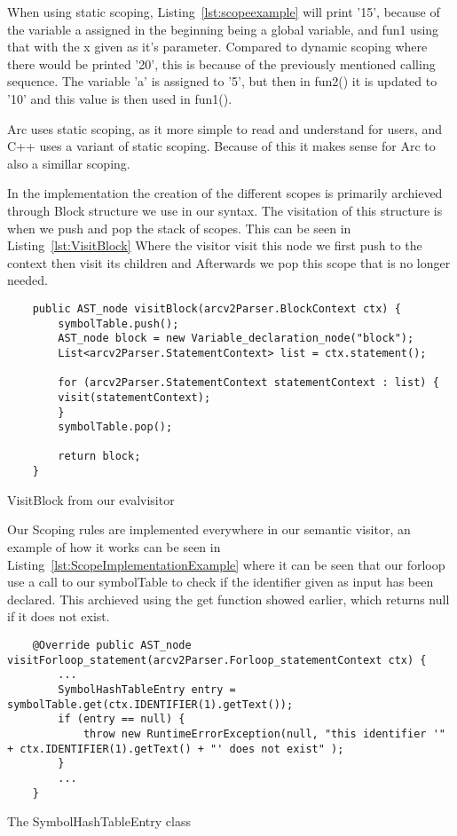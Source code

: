 When using static scoping, Listing~\ref{lst:scopeexample} will print '15', because of the variable a assigned in the beginning being a global variable, and fun1 using that with the x given as it's parameter. Compared to dynamic scoping where there would be printed '20', this is because of the previously mentioned calling sequence. The variable 'a' is assigned to '5', but then in fun2() it is updated to '10' and this value is then used in fun1().

Arc uses static scoping, as it more simple to read and understand for users, and C++ uses a variant of static scoping. Because of this it makes sense for Arc to also a simillar scoping.

In the implementation the creation of the different scopes is primarily archieved through Block structure we use in our syntax. The visitation of this structure is when we push and pop the stack of scopes. This can be seen in Listing~\ref{lst:VisitBlock} Where the visitor visit this node we first push to the context then visit its children and Afterwards we pop this scope that is no longer needed.

\begin{listing}[htb!]
    \begin{verbatim}
    public AST_node visitBlock(arcv2Parser.BlockContext ctx) {
        symbolTable.push();
        AST_node block = new Variable_declaration_node("block");
        List<arcv2Parser.StatementContext> list = ctx.statement();

        for (arcv2Parser.StatementContext statementContext : list) {
        visit(statementContext);   
        }
        symbolTable.pop();

        return block;
    }
    \end{verbatim}
    \caption{VisitBlock from our evalvisitor}
    \label{lst:VisitBlock}
\end{listing}

Our Scoping rules are implemented everywhere in our semantic visitor, an example of how it works can be seen in Listing~\ref{lst:ScopeImplementationExample} where it can be seen that our forloop use a call to our symbolTable to check if the identifier given as input has been declared. This archieved using the get function showed earlier, which returns null if it does not exist.

\begin{listing}[htb!]
    \begin{verbatim}
    @Override public AST_node visitForloop_statement(arcv2Parser.Forloop_statementContext ctx) { 
        ...
        SymbolHashTableEntry entry = symbolTable.get(ctx.IDENTIFIER(1).getText());
        if (entry == null) {
            throw new RuntimeErrorException(null, "this identifier '" + ctx.IDENTIFIER(1).getText() + "' does not exist" );
        }
        ...
    }
    \end{verbatim}
    \caption{The SymbolHashTableEntry class}
    \label{lst:ScopeImplementationExample}
\end{listing}



